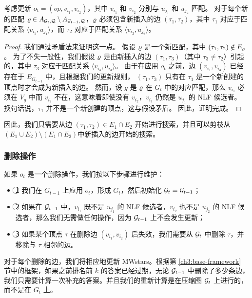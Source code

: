 \begin{theorem} \label{theorem:only-one-edge-to-search}
    考虑更新 $o_t = (op, v_{i_1}, v_{i_2})$，其中 $v_{i_1}$ 和 $v_{i_2}$ 分别与 $u_{j_1}$ 和 $u_{j_2}$ 匹配。
    对于每个新的匹配 $\varrho \in A_{\mathcal{G}_t, \mathcal{Q}} \setminus A_{\mathcal{G}_{t-1}, \mathcal{Q}}$，$\varrho$ 必须包含新插入的边 $(\tau_1, \tau_2)$，其中 $\tau_1$ 对应于匹配关系 $\langle v_{i_1}, u_{j_1} \rangle$，而 $\tau_2$ 对应于匹配关系 $\langle v_{i_2}, u_{j_2} \rangle$。
\end{theorem}

\begin{proof}
    我们通过矛盾法来证明这一点。
    假设 $\varrho$ 是一个新匹配，其中 $(\tau_1, \tau_2) \notin E_{\varrho}$。
    为了不失一般性，我们假设 $\varrho$ 是由新插入的边 $(\tau_1, \tau_3)$（其中 $\tau_3 \neq \tau_2$）引起的，其中 $\tau_3$ 对应于匹配关系 $\langle v_{i_3}, u_{i_3} \rangle$。
    由于在应用 $o_t$ 之前，边 $(v_{i_1}, v_{i_3})$ 已经存在于 $E_{G_{t-1}}$ 中，且根据我们的更新规则，
    $(\tau_1, \tau_3)$ 只有在 $\tau_1$ 是一个新创建的顶点时才会成为新插入的边。
    然而，设 $g$ 是 $\varrho$ 在 $G_t$ 中的对应匹配，那么 $v_{i_1}$ 必须在 $V_g$ 中而 $v_{i_2}$ 不在，这意味着即使没有 $v_{i_2}$，$v_{i_1}$ 仍然是 $u_{j_1}$ 的 NLF 候选者。
    换句话说，$\tau_1$ 并不是一个新创建的顶点，这与假设矛盾。
    因此，证明完成。
\end{proof}

因此，我们只需要从边 $(\tau_1, \tau_2) \in E_1 \cap E_2$ 开始进行搜索，并且可以剪枝从$(E_1 \cup E_2) \setminus (E_1 \cap E_2)$中新插入的边开始的搜索。

\subsubsection{删除操作}
如果 $o_t$ 是一个删除操作，我们按以下步骤进行维护：
\begin{itemize}
\item \textcircled{1} 我们在 $G_{t-1}$ 上应用 $o_t$，形成 $G_t$，然后初始化 $\mathcal{G}_t = \mathcal{G}_{t-1}$；
\item \textcircled{2} 如果在 $\mathcal{G}_{t-1}$ 中，$v_{i_1}$ 既不是 $u_{j_1}$ 的 NLF 候选者，$v_{i_2}$ 也不是 $u_{j_2}$ 的 NLF 候选者，那么我们无需做任何操作，因为 $\mathcal{G}_{t-1}$ 上不会发生更新；
\item \textcircled{3} 如果某个顶点 $\tau$ 在删除边 $(v_{i_1}, v_{i_2})$ 后失效，我们需要从 $\mathcal{G}_t$ 中删除 $\tau$，并移除与 $\tau$ 相邻的边。
\end{itemize}

对于每个删除的边，我们将相应地更新 MWstars。根据第 \ref{ch3:base-framework} 节中的框架，如果之前排名前 $k$ 的答案已经过期，无论 $\mathcal{G}_{t-1}$ 中删除了多少条边，我们只需要计算一次补充的答案。并且我们的重新计算是在压缩图 $\mathcal{G}_t$ 上进行的，而不是在 $G_t$ 上。